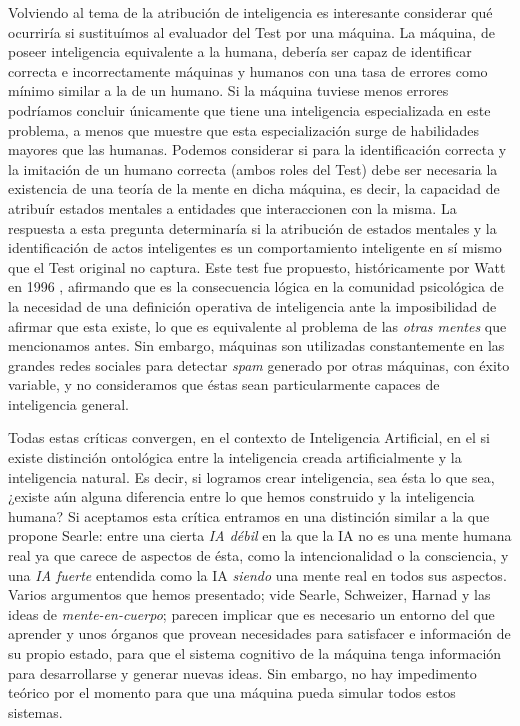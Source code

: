 \documentclass[12pt]{memoir}
\begin{document}
\nocite{newmind}

Volviendo al tema de la atribución de inteligencia es interesante considerar qué ocurriría si sustituímos al evaluador del Test por una máquina. La máquina, de poseer inteligencia equivalente a la humana, debería ser capaz de identificar correcta e incorrectamente máquinas y humanos con una tasa de errores como mínimo similar a la de un humano. Si la máquina tuviese menos errores podríamos concluir únicamente que tiene una inteligencia especializada en este problema, a menos que muestre que esta especialización surge de habilidades mayores que las humanas. Podemos considerar si para la identificación correcta y la imitación de un humano correcta (ambos roles del Test) debe ser necesaria la existencia de una teoría de la mente en dicha máquina, es decir, la capacidad de atribuír estados mentales a entidades que interaccionen con la misma. La respuesta a esta pregunta determinaría si la atribución de estados mentales y la identificación de actos inteligentes es un comportamiento inteligente en sí mismo que el Test original no captura. Este test fue propuesto, históricamente por Watt en 1996 \parencite[apartado 4.4.3]{afterTuring}, afirmando que es la consecuencia lógica en la comunidad psicológica de la necesidad de una definición operativa de inteligencia ante la imposibilidad de afirmar que esta existe, lo que es equivalente al problema de las \textit{otras mentes} que mencionamos antes. Sin embargo, máquinas son utilizadas constantemente en las grandes redes sociales para detectar \textit{spam} generado por otras máquinas, con éxito variable, y no consideramos que éstas sean particularmente capaces de inteligencia general.

Todas estas críticas convergen, en el contexto de Inteligencia Artificial, en el si existe distinción ontológica entre la inteligencia creada artificialmente y la inteligencia natural. Es decir, si logramos crear inteligencia, sea ésta lo que sea, ¿existe aún alguna diferencia entre lo que hemos construido y la inteligencia humana? Si aceptamos esta crítica entramos en una distinción similar a la que propone Searle: entre una cierta \textit{IA débil} en la que la IA no es una mente humana real ya que carece de aspectos de ésta, como la intencionalidad o la consciencia, y una \textit{IA fuerte} entendida como la IA \textit{siendo} una mente real en todos sus aspectos. Varios argumentos que hemos presentado; vide Searle, Schweizer, Harnad y las ideas de \textit{mente-en-cuerpo}; parecen implicar que es necesario un entorno del que aprender y unos órganos que provean necesidades para satisfacer e información de su propio estado, para que el sistema cognitivo de la máquina tenga información para desarrollarse y generar nuevas ideas. Sin embargo, no hay impedimento teórico por el momento para que una máquina pueda simular todos estos sistemas. 
\end{document}
